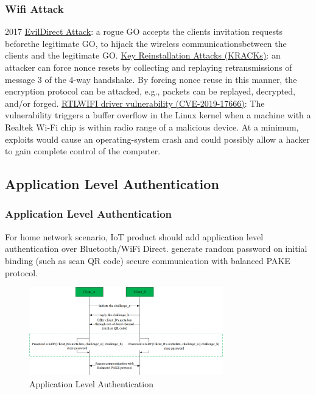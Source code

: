 \documentclass{ctexbeamer}
\begin{document}
\begin{frame}
\frametitle{Wifi Attack}

    2017 \href{https://ieeexplore.ieee.org/document/8038416}{EvilDirect Attack}: a rogue GO accepts  the  clients  invitation  requests  beforethe  legitimate  GO,  to  hijack  the  wireless  communicationsbetween the clients and the legitimate GO.
\newline
{} \href{https://www.krackattacks.com/}{Key Reinstallation Attacks (KRACKs)}: an attacker can force nonce resets by collecting and replaying retransmissions of message 3 of the 4-way handshake. By forcing nonce reuse in this manner, the encryption protocol can be attacked, e.g., packets can be replayed, decrypted, and/or forged.
\newline
{} \href{https://arstechnica.com/information-technology/2019/10/unpatched-linux-flaw-may-let-attackers-crash-or-compromise-nearby-devices/}{RTLWIFI driver vulnerability (CVE-2019-17666)}: The vulnerability triggers a buffer overflow in the Linux kernel when a machine with a Realtek Wi-Fi chip is within radio range of a malicious device. At a minimum, exploits would cause an operating-system crash and could possibly allow a hacker to gain complete control of the computer.
    

\end{frame}

\subsection{Application Level Authentication}
\begin{frame}
\frametitle{Application Level Authentication}

For home network scenario, IoT product should add application level authentication over Bluetooth/WiFi Direct.
\newline
\newline
generate random password on initial binding (such as scan QR code)
\newline
secure communication with balanced PAKE protocol.

    \begin{figure}[H]
        \centering 
        \includegraphics[width=0.75\textwidth]{pic/pake.png} 
        \caption{Application Level Authentication} 
        \label{fig.pake}
    \end{figure}

\end{frame}
\end{document}
